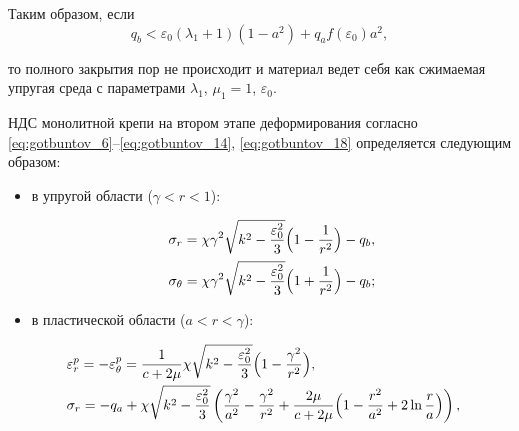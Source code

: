 Таким образом, если $$q_b<\varepsilon_0(\lambda_1+1)(1-a^2)+q_a   f(\varepsilon_0)a^2,$$ 

то полного закрытия пор не происходит и материал ведет себя как сжимаемая упругая среда с параметрами $\lambda_1$, $\mu_1=1$, $\varepsilon_0$.



НДС монолитной крепи на втором этапе деформирования согласно \eqref{eq:gotbuntov_6}--\eqref{eq:gotbuntov_14}, \eqref{eq:gotbuntov_18} определяется следующим образом: 



\begin{itemize}



\item[--] в упругой области ($\gamma<r<1$):

\begin{equation} 

\label{eq:gotbuntov_19}

\begin{array}{l}

\displaystyle

\sigma_r=\chi\gamma^2\sqrt{k^2-\frac{\varepsilon_0^2}{3}}\Bigl(1-\frac{1}{r^2}\Bigr)-q_b, \\[3mm]

\displaystyle

\sigma_{\theta}=\chi\gamma^2\sqrt{k^2-\frac{\varepsilon_0^2}{3}}\Bigl(1+\frac{1}{r^2}\Bigr)-q_b;  

\end{array}

\end{equation} 



\item[--] в пластической области ($a<r<\gamma$):

\begin{equation}

\hspace{-4mm}

\begin{array}{l}

\displaystyle

\varepsilon_r^p=-\varepsilon_{\theta}^p=\frac1{c+2\mu}{\chi\sqrt{k^2-\frac{\varepsilon_0^2}3}}\Bigl(1-\frac{\gamma^2}{r^2}\Bigr),

\\[3mm]  

\displaystyle

\sigma_r=-q_a+\chi\sqrt{k^2-\frac{\varepsilon_0^2}{3}}\left(\frac{\gamma^2}{a^2}-\frac{\gamma^2}{r^2}+\frac{2\mu}{c+2\mu}\Bigl(1-\frac{r^2}{a^2}+2\ln\frac{r}{a}\Bigr)\right) ,


\end{array}
\end{equation}
\end{itemize}

